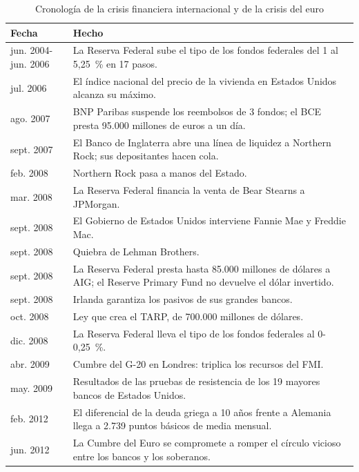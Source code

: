 \documentclass[11pt]{article}
\begin{document}
\begin{table}[H]
\centering
\caption{Cronología de la crisis financiera internacional y de la crisis del euro}\label{tab:cronologia}
\small
\begin{tabular}{>{\raggedright\arraybackslash}m{3cm}|>{\raggedright\arraybackslash}m{11.4cm}}
\rowcolor{tceeazulpalido}\textbf{Fecha} & \textbf{Hecho}\\ \hline
jun. 2004-jun. 2006 & La Reserva Federal sube el tipo de los fondos federales del 1 al 5,25~\% en 17 pasos.\\ \hline
jul. 2006 & El índice nacional del precio de la vivienda en Estados Unidos alcanza su máximo.\\ \hline
9 ago. 2007 & BNP Paribas suspende los reembolsos de 3 fondos; el BCE presta 95.000 millones de euros a un día.\\ \hline
14 sept. 2007 & El Banco de Inglaterra abre una línea de liquidez a Northern Rock; sus depositantes hacen cola.\\ \hline
17 feb. 2008 & Northern Rock pasa a manos del Estado.\\ \hline
mar. 2008 & La Reserva Federal financia la venta de Bear Stearns a JPMorgan.\\ \hline
7 sept. 2008 & El Gobierno de Estados Unidos interviene Fannie Mae y Freddie Mac.\\ \hline
15 sept. 2008 & Quiebra de Lehman Brothers.\\ \hline
16 sept. 2008 & La Reserva Federal presta hasta 85.000 millones de dólares a AIG; el Reserve Primary Fund no devuelve el dólar invertido.\\ \hline
30 sept. 2008 & Irlanda garantiza los pasivos de sus grandes bancos.\\ \hline
3 oct. 2008 & Ley que crea el TARP, de 700.000 millones de dólares.\\ \hline
16 dic. 2008 & La Reserva Federal lleva el tipo de los fondos federales al 0-0,25~\%.\\ \hline
abr. 2009 & Cumbre del G-20 en Londres: triplica los recursos del FMI.\\ \hline
may. 2009 & Resultados de las pruebas de resistencia de los 19 mayores bancos de Estados Unidos.\\ \hline
feb. 2012 & El diferencial de la deuda griega a 10 años frente a Alemania llega a 2.739 puntos básicos de media mensual.\\ \hline
29 jun. 2012 & La Cumbre del Euro se compromete a romper el círculo vicioso entre los bancos y los soberanos.\\ \hline

\end{tabular}
\end{table}
\end{document}

